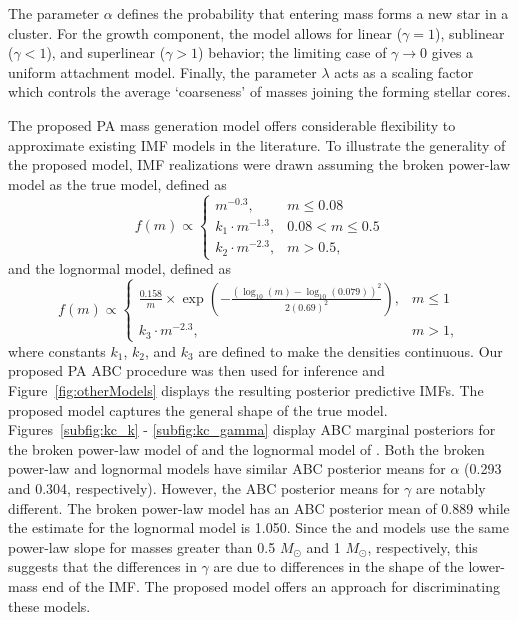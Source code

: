 \documentclass[ejs]{imsart}
\numberwithin{equation}{section}
\theoremstyle{plain}
\newcommand{\Msun}{M_{\odot}}
\begin{document}
The parameter $\alpha$ defines the probability that entering mass forms a new star in a cluster.  For the growth component, the model allows for linear ($\gamma = 1$), sublinear ($\gamma < 1$), and superlinear ($\gamma > 1$) behavior; the limiting case of $\gamma \to 0$ gives a uniform attachment model.  Finally, the parameter $\lambda$ acts as a scaling factor which controls the average `coarseness' of masses joining the forming stellar cores. 

The proposed PA mass generation model offers considerable flexibility to approximate existing IMF models in the literature.  To illustrate the generality of the proposed model, IMF realizations were drawn assuming the \cite{kroupa2001} 
%
broken power-law model as the true model, defined as
\begin{equation}
f(m) \propto \left\{
  \begin{array}{lr}
   m^{-0.3}, &  m \leq 0.08 \\
   k_1 \cdot m^{-1.3}, &  0.08 < m \leq 0.5 \\
   k_2 \cdot m^{-2.3}, &  m > 0.5,
  \end{array}
\right. \label{eq:kroupa}
\end{equation}
%
and the \cite{Chabrier:2003oq, Chabrier:2003om} lognormal model, defined as
%
\begin{equation}
f(m) \propto \left\{
  \begin{array}{lr}
    \frac{0.158}{m} \times \exp \left ( -\frac{(\log_{10}(m) - \log_{10}(0.079))^2}{2(0.69)^2}\right), &  m \leq 1\\
   k_3 \cdot m^{-2.3}, &  m > 1,
  \end{array}
\right. \label{eq:chab}
\end{equation}
%
where constants $k_1$, $k_2$, and $k_3$ are defined to make the densities continuous.
%
Our proposed PA ABC procedure was then used for inference and Figure~\ref{fig:otherModels} displays the resulting posterior predictive IMFs.  The proposed model captures the general shape of the true model.  Figures~\ref{subfig:kc_k} - \ref{subfig:kc_gamma} display ABC marginal posteriors for the broken power-law model of \cite{kroupa2001} and the lognormal model of  \cite{Chabrier:2003oq, Chabrier:2003om}.  Both the broken power-law and lognormal models have similar ABC posterior means for $\alpha$ (0.293 and 0.304, respectively).  However, the ABC posterior means for $\gamma$ are notably different.  The broken power-law model has an ABC posterior mean of 0.889 while the estimate for the lognormal model is 1.050.  Since the  \cite{kroupa2001} and \cite{Chabrier:2003oq, Chabrier:2003om} models use the same power-law slope for masses greater than 0.5 $\Msun$ and 1 $\Msun$, respectively, this suggests that the differences in $\gamma$ are due to differences in the shape of the lower-mass end of the IMF.  The proposed model offers an approach for discriminating these models.
\end{document}
